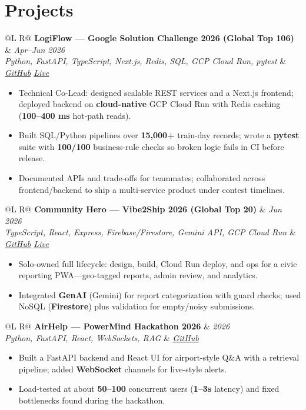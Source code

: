 \documentclass[a4paper,10pt]{article}
\makeatletter
\newcommand{\proj}[4]{%
  \vspace{1.5mm}
  \noindent\begin{tabularx}{\textwidth}{@{}L R@{}}
    \textbf{#1} & \textit{\small #2} \\
    \textit{\small #3} & \textit{\small #4} \\
  \end{tabularx}\par
  \vspace{0.5mm}%
}
\makeatother
\begin{document}
\section{Projects}
\proj{LogiFlow --- Google Solution Challenge 2026 (Global Top 106)}{Apr--Jun 2026}
{Python, FastAPI, TypeScript, Next.js, Redis, SQL, GCP Cloud Run, pytest}
{\href{https://github.com/Ojas-Srivastava05/LogiFlow-Solution-Challenge-2026}{GitHub} \textbar{} \href{https://logi-flow-solution-challenge-2026.vercel.app}{Live}}
\begin{itemize}
  \item Technical Co-Lead: designed scalable REST services and a Next.js frontend; deployed backend on \textbf{cloud-native} GCP Cloud Run with Redis caching (\textbf{100--400 ms} hot-path reads).
  \item Built SQL/Python pipelines over \textbf{15,000+} train-day records; wrote a \textbf{pytest} suite with \textbf{100/100} business-rule checks so broken logic fails in CI before release.
  \item Documented APIs and trade-offs for teammates; collaborated across frontend/backend to ship a multi-service product under contest timelines.
\end{itemize}

\proj{Community Hero --- Vibe2Ship 2026 (Global Top 20)}{Jun 2026}
{TypeScript, React, Express, Firebase/Firestore, Gemini API, GCP Cloud Run}
{\href{https://github.com/Ojas-Srivastava05/community-hero}{GitHub} \textbar{} \href{https://community-hero-987477089222.asia-south1.run.app}{Live}}
\begin{itemize}
  \item Solo-owned full lifecycle: design, build, Cloud Run deploy, and ops for a civic reporting PWA---geo-tagged reports, admin review, and analytics.
  \item Integrated \textbf{GenAI} (Gemini) for report categorization with guard checks; used NoSQL (\textbf{Firestore}) plus validation for empty/noisy submissions.
\end{itemize}

\proj{AirHelp --- PowerMind Hackathon 2026}{2026}
{Python, FastAPI, React, WebSockets, RAG}
{\href{https://github.com/Ojas-Srivastava05/AirHelp-AI-Airport-Assistant}{GitHub}}
\begin{itemize}
  \item Built a FastAPI backend and React UI for airport-style Q\&A with a retrieval pipeline; added \textbf{WebSocket} channels for live-style alerts.
  \item Load-tested at about \textbf{50--100} concurrent users (\textbf{1--3s} latency) and fixed bottlenecks found during the hackathon.
\end{itemize}
\end{document}
